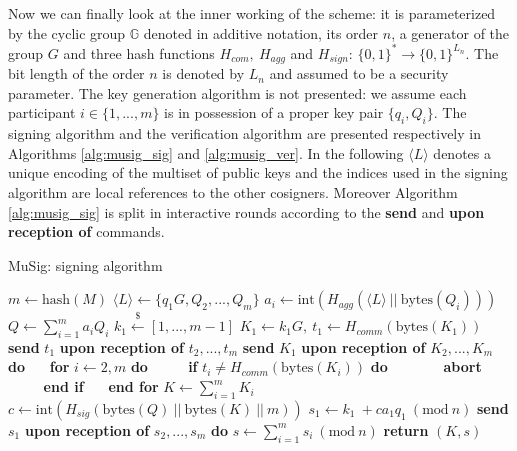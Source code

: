 \bigskip
\noindent
Now we can finally look at the inner working of the scheme: it is parameterized by the cyclic group $\mathbb{G}$ denoted in additive notation, its order $n$, a generator of the group $G$ and three hash functions $H_{com}, \ H_{agg}$ and $H_{sign}$: $\{0, 1\}^* \to \{0, 1\}^{L_n}$. The bit length of the order $n$ is denoted by $L_n$ and assumed to be a security parameter. The key generation algorithm is not presented: we assume each participant $i \in \{1, ..., m\}$ is in possession of a proper key pair $\{q_i, Q_i\}$. The signing algorithm and the verification algorithm are presented respectively in Algorithms \ref{alg:musig_sig} and \ref{alg:musig_ver}. In the following $\langle L \rangle$ denotes a unique encoding of the multiset of public keys and the indices used in the signing algorithm are local references to the other cosigners. Moreover Algorithm \ref{alg:musig_sig} is split in interactive rounds according to the \textbf{send} and \textbf{upon reception of} commands.

\bigskip

\begin{algorithm}
	\caption{MuSig: signing algorithm}
	\label{alg:musig_sig}
	\begin{algorithmic}[1]
		\State $m \gets \text{hash}(M)$
		\State $\langle L \rangle \gets \{q_1G, Q_2, ..., Q_m\}$
		\State $a_i \gets \text{int}(H_{agg}(\langle L \rangle \ || \ \text{bytes}(Q_i)))$
		\EndFor
		\State $Q \gets \sum_{i = 1}^{m}a_iQ_i$
		\State $k_1 \xleftarrow{\text{\$}} [1, ..., m - 1]$
		\State $K_1 \gets k_1G, \ t_1 \gets H_{comm}(\text{bytes}(K_1))$
		\State \textbf{send} $t_1$
		\State \textbf{upon reception of} $t_2, ..., t_m$ \textbf{send} $K_1$
		\State \textbf{upon reception of} $K_2, ..., K_m$ \textbf{do}
		\State $\ \ \ \ \ $ \textbf{for} $i \gets 2, m$ \textbf{do}
		\State $\ \ \ \ \ \ \ \ \ \ $ \textbf{if} $t_i \neq H_{comm}(\text{bytes}(K_i))$ \textbf{do}
		\State $\ \ \ \ \ \ \ \ \ \ \ \ \ \ \ $ \textbf{abort}
		\State $\ \ \ \ \ \ \ \ \ \ $ \textbf{end if}
		\State $\ \ \ \ \ $ \textbf{end for} 
		\State $K \gets \sum_{i = 1}^{m}K_i$
		\State $c \gets \text{int}(H_{sig}(\text{bytes}(Q) \ || \ \text{bytes}(K) \ || \ m))$
		\State $s_1 \gets k_1\ + ca_1q_1 \ (\text{mod} \ n)$
		\State \textbf{send} $s_1$
		\State \textbf{upon reception of} $s_2, ..., s_m$ \textbf{do}
		\State $s \gets \sum_{i = 1}^{m}s_i \ (\text{mod} \ n)$
		\State \textbf{return} $(K, s)$
		\EndProcedure
	\end{algorithmic}
\end{algorithm}

